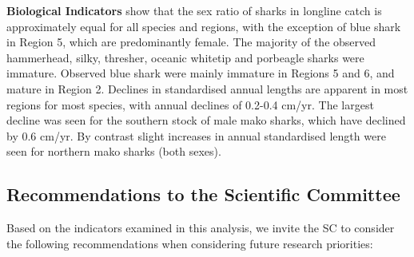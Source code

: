 \documentclass[12pt]{SCreport}
\begin{document}
\textbf{Biological Indicators} show that the sex ratio of sharks in longline catch is approximately equal for all species and regions, with the exception of blue shark in Region 5, which are predominantly female.
 The majority of the observed hammerhead, silky, thresher, oceanic whitetip and porbeagle sharks were immature. Observed blue shark were mainly immature in Regions 5 and 6, and mature in Region 2. Declines in standardised annual lengths are apparent in most regions for most species, with annual declines of 0.2-0.4 cm/yr.
The largest decline was seen for the southern stock of male mako sharks, which have declined by 0.6 cm/yr. By contrast slight increases in annual standardised length were seen for northern mako sharks (both sexes).


\subsection*{Recommendations to the Scientific Committee}
Based on the indicators examined in this analysis, we invite the SC to consider the following recommendations when considering future research priorities: 
 
\end{document}
